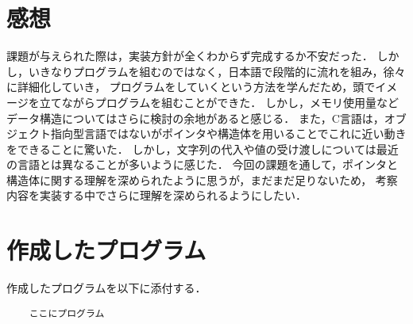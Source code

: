 \documentclass[a4j,11pt]{jarticle}
\begin{document}
\section{感想}
課題が与えられた際は，実装方針が全くわからず完成するか不安だった．
しかし，いきなりプログラムを組むのではなく，日本語で段階的に流れを組み，徐々に詳細化していき，
プログラムをしていくという方法を学んだため，頭でイメージを立てながらプログラムを組むことができた．
しかし，メモリ使用量などデータ構造についてはさらに検討の余地があると感じる．
また，C言語は，オブジェクト指向型言語ではないがポインタや構造体を用いることでこれに近い動きをできることに驚いた．
しかし，文字列の代入や値の受け渡しについては最近の言語とは異なることが多いように感じた．
今回の課題を通して，ポインタと構造体に関する理解を深められたように思うが，まだまだ足りないため，
考察内容を実装する中でさらに理解を深められるようにしたい．
\section{作成したプログラム}\label{sec:program}

作成したプログラムを以下に添付する．

%
%
{\fontsize{10pt}{11pt} \selectfont
\begin{verbatim}
    ここにプログラム
\end{verbatim}
}

\end{document}
